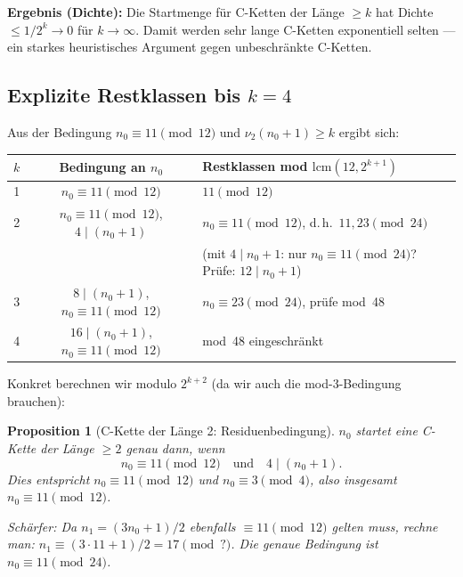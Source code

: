 \documentclass[12pt,a4paper]{article}
\newtheorem{proposition}[definition]{Proposition}
\newcommand{\vii}{\nu_2}
\begin{document}
\begin{tcolorbox}[ergebnis]
\textbf{Ergebnis (Dichte):} Die Startmenge für C-Ketten der Länge $\geq k$
hat Dichte $\leq 1/2^k \to 0$ für $k \to \infty$. Damit werden sehr lange
C-Ketten exponentiell selten --- ein starkes heuristisches Argument gegen
unbeschränkte C-Ketten.
\end{tcolorbox}

\subsection{Explizite Restklassen bis $k=4$}

Aus der Bedingung $n_0 \equiv 11 \pmod{12}$ und $\vii(n_0+1) \geq k$
ergibt sich:

\medskip
\begin{center}
\renewcommand{\arraystretch}{1.4}
\begin{tabular}{ccl}
\toprule
$k$ & Bedingung an $n_0$ & Restklassen mod $\mathrm{lcm}(12, 2^{k+1})$ \\
\midrule
1 & $n_0 \equiv 11 \pmod{12}$ & $11 \pmod{12}$ \\
2 & $n_0 \equiv 11 \pmod{12}$, $4 \mid (n_0+1)$ & $n_0 \equiv 11 \pmod{12}$, d.\,h.\ $11, 23 \pmod{24}$ \\
  & & (mit $4\mid n_0+1$: nur $n_0 \equiv 11 \pmod{24}$? Prüfe: $12\mid n_0+1$) \\
3 & $8 \mid (n_0+1)$, $n_0 \equiv 11 \pmod{12}$ & $n_0 \equiv 23 \pmod{24}$, prüfe mod~48 \\
4 & $16 \mid (n_0+1)$, $n_0 \equiv 11 \pmod{12}$ & mod~48 eingeschränkt \\
\bottomrule
\end{tabular}
\end{center}

\medskip
Konkret berechnen wir modulo $2^{k+2}$ (da wir auch die mod-3-Bedingung
brauchen):

\begin{proposition}[C-Kette der Länge 2: Residuenbedingung]
\label{prop:laenge2}
$n_0$ startet eine C-Kette der Länge $\geq 2$ genau dann, wenn
\[
  n_0 \equiv 11 \pmod{12}
  \quad\text{und}\quad
  4 \mid (n_0 + 1).
\]
Dies entspricht $n_0 \equiv 11 \pmod{12}$ und $n_0 \equiv 3 \pmod 4$,
also insgesamt $n_0 \equiv 11 \pmod{12}$.

\textit{Schärfer:} Da $n_1 = (3n_0+1)/2$ ebenfalls $\equiv 11 \pmod{12}$
gelten muss, rechne man: $n_1 \equiv (3 \cdot 11 + 1)/2 = 17 \pmod{?}$.
Die genaue Bedingung ist $n_0 \equiv 11 \pmod{24}$.
\end{proposition}
\end{document}

